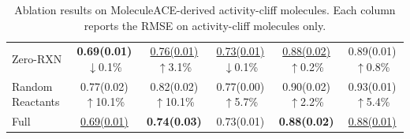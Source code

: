 \begin{table}[t]
{\begin{tabular}{l*{5}{c}}
Zero-RXN
& \shortstack{\textbf{0.69(0.01)}\\$\downarrow$0.1\%}
& \shortstack{\underline{0.76(0.01)}\\$\uparrow$3.1\%}
& \shortstack{\underline{0.73(0.01)}\\$\downarrow$0.1\%}
& \shortstack{\underline{0.88(0.02)}\\$\uparrow$0.2\%}
& \shortstack{0.89(0.01)\\$\uparrow$0.8\%} \\

Random Reactants
& \shortstack{0.77(0.02)\\$\uparrow$10.1\%}
& \shortstack{0.82(0.02)\\$\uparrow$10.1\%}
& \shortstack{0.77(0.00)\\$\uparrow$5.7\%}
& \shortstack{0.90(0.02)\\$\uparrow$2.2\%}
& \shortstack{0.93(0.01)\\$\uparrow$5.4\%} \\

Full
& \underline{0.69(0.01)}
& \textbf{0.74(0.03)}
& 0.73(0.01)
& \textbf{0.88(0.02)}
& \underline{0.88(0.01)} \\

\hline
\end{tabular}
}
\caption{Ablation results on MoleculeACE-derived activity-cliff molecules. Each column reports the RMSE on activity-cliff molecules only.}
\label{tab:clif_ablation}
\end{table}
